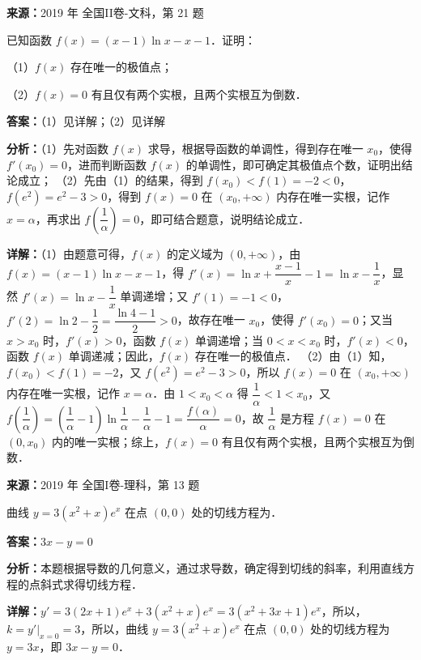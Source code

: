 \begin{question}[points=12]
\textbf{来源：}2019 年 全国II卷-文科，第 21 题\par
已知函数 $f(x)=(x-1)\ln x-x-1$．证明：

（1）$f(x)$ 存在唯一的极值点；

（2）$f(x)=0$ 有且仅有两个实根，且两个实根互为倒数．
\begin{solution}
\textbf{答案：}（1）见详解；（2）见详解

\textbf{分析：}（1）先对函数 $f(x)$ 求导，根据导函数的单调性，得到存在唯一 $x_0$，使得 $f'(x_0)=0$，进而判断函数 $f(x)$ 的单调性，即可确定其极值点个数，证明出结论成立；
（2）先由（1）的结果，得到 $f(x_0)<f(1)=-2<0$，$f(e^2)=e^2-3>0$，得到 $f(x)=0$ 在 $(x_0,+\infty)$ 内存在唯一实根，记作 $x=\alpha$，再求出 $f\left(\dfrac{1}{\alpha}\right)=0$，即可结合题意，说明结论成立．

\textbf{详解：}（1）由题意可得，$f(x)$ 的定义域为 $(0,+\infty)$，由 $f(x)=(x-1)\ln x-x-1$，得 $f'(x)=\ln x+\dfrac{x-1}{x}-1=\ln x-\dfrac{1}{x}$，显然 $f'(x)=\ln x-\dfrac{1}{x}$ 单调递增；又 $f'(1)=-1<0$，$f'(2)=\ln2-\dfrac{1}{2}=\dfrac{\ln4-1}{2}>0$，故存在唯一 $x_0$，使得 $f'(x_0)=0$；又当 $x>x_0$ 时，$f'(x)>0$，函数 $f(x)$ 单调递增；当 $0<x<x_0$ 时，$f'(x)<0$，函数 $f(x)$ 单调递减；因此，$f(x)$ 存在唯一的极值点．
（2）由（1）知，$f(x_0)<f(1)=-2$，又 $f(e^2)=e^2-3>0$，所以 $f(x)=0$ 在 $(x_0,+\infty)$ 内存在唯一实根，记作 $x=\alpha$．由 $1<x_0<\alpha$ 得 $\dfrac{1}{\alpha}<1<x_0$，又 $f\left(\dfrac{1}{\alpha}\right)=\left(\dfrac{1}{\alpha}-1\right)\ln\dfrac{1}{\alpha}-\dfrac{1}{\alpha}-1=\dfrac{f(\alpha)}{\alpha}=0$，故 $\dfrac{1}{\alpha}$ 是方程 $f(x)=0$ 在 $(0,x_0)$ 内的唯一实根；综上，$f(x)=0$ 有且仅有两个实根，且两个实根互为倒数．
\end{solution}
\end{question}

\begin{question}[points=5]
\textbf{来源：}2019 年 全国I卷-理科，第 13 题\par
曲线 $y = 3(x^2 + x)e^x$ 在点 $(0, 0)$ 处的切线方程为．
\fillin[{$3x - y = 0$}]
\begin{solution}
\textbf{答案：}$3x - y = 0$

\textbf{分析：}本题根据导数的几何意义，通过求导数，确定得到切线的斜率，利用直线方程的点斜式求得切线方程．

\textbf{详解：}$y' = 3(2x + 1)e^x + 3(x^2 + x)e^x = 3(x^2 + 3x + 1)e^x$，所以，$k = y'|_{x=0} = 3$，所以，曲线 $y = 3(x^2 + x)e^x$ 在点 $(0, 0)$ 处的切线方程为 $y = 3x$，即 $3x - y = 0$．
\end{solution}
\end{question}

